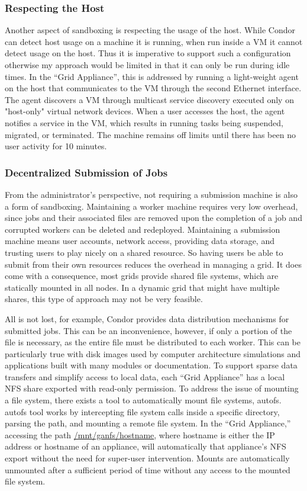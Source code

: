 \subsubsection{Respecting the Host}

Another aspect of sandboxing is respecting the usage of the host.  While Condor
can detect host usage on a machine it is running, when run inside a VM it
cannot detect usage on the host.  Thus it is imperative to support such a
configuration otherwise my approach would be limited in that it can only be
run during idle times.  In the ``Grid Appliance'', this is addressed by running
a light-weight agent on the host that communicates to the VM through the second
Ethernet interface.  The agent discovers a VM through multicast service
discovery executed only on "host-only" virtual network devices.  When a user
accesses the host, the agent notifies a service in the VM, which results in
running tasks being suspended, migrated, or terminated.  The machine remains
off limits until there has been no user activity for 10 minutes.

\subsubsection{Decentralized Submission of Jobs}

From the administrator's perspective, not requiring a submission machine is
also a form of sandboxing.  Maintaining a worker machine requires very low
overhead, since jobs and their associated files are removed upon the completion
of a job and corrupted workers can be deleted and redeployed.  Maintaining a
submission machine means user accounts, network access, providing data storage,
and trusting users to play nicely on a shared resource.  So having users be
able to submit from their own resources reduces the overhead in managing a
grid.  It does come with a consequence, most grids provide shared file systems,
which are statically mounted in all nodes.  In a dynamic grid that might have
multiple shares, this type of approach may not be very feasible.

All is not lost, for example, Condor provides data distribution mechanisms for
submitted jobs.  This can be an inconvenience, however, if only a portion of
the file is necessary, as the entire file must be distributed to each worker.
This can be particularly true with disk images used by computer architecture
simulations and applications built with many modules or documentation.  To
support sparse data transfers and simplify access to local data, each ``Grid
Appliance'' has a local NFS share exported with read-only permission.  To
address the issue of mounting a file system, there exists a tool to
automatically mount file systems, autofs. autofs tool works by intercepting
file system calls inside a specific directory, parsing the path, and mounting a
remote file system.  In the ``Grid Appliance,'' accessing the path
\url{/mnt/ganfs/hostname}, where hostname is either the IP address or hostname
of an appliance, will automatically that appliance's NFS export without the
need for super-user intervention.  Mounts are automatically unmounted after a
sufficient period of time without any access to the mounted file system.  

